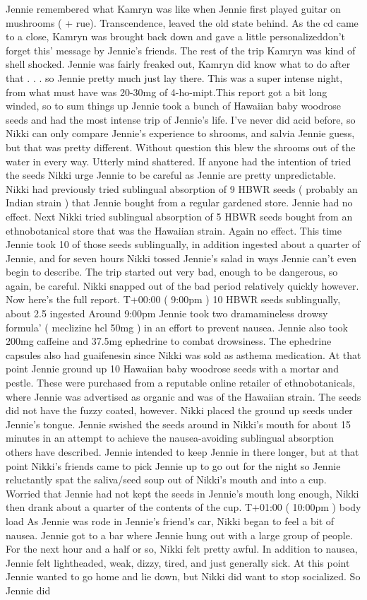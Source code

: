 \documentclass[12pt]{book}
\begin{document}
Jennie remembered what Kamryn was like when Jennie first played guitar on mushrooms ( + rue). Transcendence, leaved the old state behind. As the cd came to a close, Kamryn was brought back down and gave a little personalizeddon't forget this' message by Jennie's friends. The rest of the trip Kamryn was kind of shell shocked. Jennie was fairly freaked out, Kamryn did know what to do after that . . .  so Jennie pretty much just lay there. This was a super intense night, from what must have was 20-30mg of 4-ho-mipt.This report got a bit long winded, so to sum things up Jennie took a bunch of Hawaiian baby woodrose seeds and had the most intense trip of Jennie's life. I've never did acid before, so Nikki can only compare Jennie's experience to shrooms, and salvia Jennie guess, but that was pretty different. Without question this blew the shrooms out of the water in every way. Utterly mind shattered. If anyone had the intention of tried the seeds Nikki urge Jennie to be careful as Jennie are pretty unpredictable. Nikki had previously tried sublingual absorption of 9 HBWR seeds ( probably an Indian strain ) that Jennie bought from a regular gardened store. Jennie had no effect. Next Nikki tried sublingual absorption of 5 HBWR seeds bought from an ethnobotanical store that was the Hawaiian strain. Again no effect. This time Jennie took 10 of those seeds sublingually, in addition ingested about a quarter of Jennie, and for seven hours Nikki tossed Jennie's salad in ways Jennie can't even begin to describe. The trip started out very bad, enough to be dangerous, so again, be careful. Nikki snapped out of the bad period relatively quickly however. Now here's the full report. T+00:00 ( 9:00pm ) 10 HBWR seeds sublingually, about 2.5 ingested Around 9:00pm Jennie took two dramamineless drowsy formula' ( meclizine hcl 50mg ) in an effort to prevent nausea. Jennie also took 200mg caffeine and 37.5mg ephedrine to combat drowsiness. The ephedrine capsules also had guaifenesin since Nikki was sold as asthema medication. At that point Jennie ground up 10 Hawaiian baby woodrose seeds with a mortar and pestle. These were purchased from a reputable online retailer of ethnobotanicals, where Jennie was advertised as organic and was of the Hawaiian strain. The seeds did not have the fuzzy coated, however. Nikki placed the ground up seeds under Jennie's tongue. Jennie swished the seeds around in Nikki's mouth for about 15 minutes in an attempt to achieve the nausea-avoiding sublingual absorption others have described. Jennie intended to keep Jennie in there longer, but at that point Nikki's friends came to pick Jennie up to go out for the night so Jennie reluctantly spat the saliva/seed soup out of Nikki's mouth and into a cup. Worried that Jennie had not kept the seeds in Jennie's mouth long enough, Nikki then drank about a quarter of the contents of the cup. T+01:00 ( 10:00pm ) body load As Jennie was rode in Jennie's friend's car, Nikki began to feel a bit of nausea. Jennie got to a bar where Jennie hung out with a large group of people. For the next hour and a half or so, Nikki felt pretty awful. In addition to nausea, Jennie felt lightheaded, weak, dizzy, tired, and just generally sick. At this point Jennie wanted to go home and lie down, but Nikki did want to stop socialized. So Jennie did 
\end{document}
